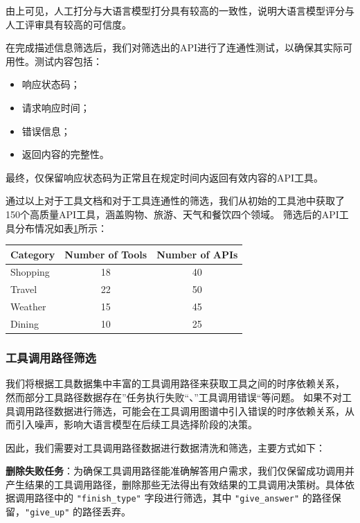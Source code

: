 由上可见，人工打分与大语言模型打分具有较高的一致性，说明大语言模型评分与人工评审具有较高的可信度。

在完成描述信息筛选后，我们对筛选出的API进行了连通性测试，以确保其实际可用性。测试内容包括：
\begin{itemize}
    \item 响应状态码；
    \item 请求响应时间；
    \item 错误信息；
    \item 返回内容的完整性。
\end{itemize}

最终，仅保留响应状态码为正常且在规定时间内返回有效内容的API工具。

通过以上对于工具文档和对于工具连通性的筛选，我们从初始的工具池中获取了150个高质量API工具，涵盖购物、旅游、天气和餐饮四个领域。
筛选后的API工具分布情况如表\ref{tab:api_distribution}所示：

\begin{table}[h]
  \centering
  \label{tab:api_distribution}
  \begin{tabular}{l|c|c}
  \toprule
  \textbf{Category} & \textbf{Number of Tools} & \textbf{Number of APIs} \\ \midrule
  Shopping & 18 & 40 \\ \hline
  Travel   & 22 & 50 \\ \hline
  Weather  & 15 & 45 \\ \hline
  Dining   & 10 & 25 \\ 
  \bottomrule
  \end{tabular}
  \end{table}

\subsubsection{工具调用路径筛选}

我们将根据工具数据集中丰富的工具调用路径来获取工具之间的时序依赖关系，
然而部分工具路径数据存在”任务执行失败“、”工具调用错误“等问题。
如果不对工具调用路径数据进行筛选，可能会在工具调用图谱中引入错误的时序依赖关系，从而引入噪声，影响大语言模型在后续工具选择阶段的决策。

因此，我们需要对工具调用路径数据进行数据清洗和筛选，主要方式如下：

\textbf{删除失败任务}：为确保工具调用路径能准确解答用户需求，我们仅保留成功调用并产生结果的工具调用路径，删除那些无法得出有效结果的工具调用决策树。具体依据调用路径中的 \texttt{"finish\_type"} 字段进行筛选，其中 \texttt{"give\_answer"} 的路径保留，\texttt{"give\_up"} 的路径丢弃。

